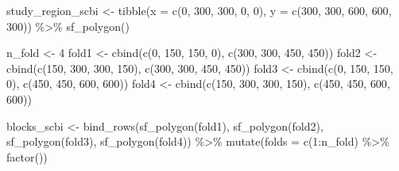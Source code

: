 \documentclass[12pt]{article}
\newenvironment{Shaded}{\begin{snugshade}}{\end{snugshade}}
\newcommand{\AttributeTok}[1]{\textcolor[rgb]{0.77,0.63,0.00}{#1}}
\newcommand{\DecValTok}[1]{\textcolor[rgb]{0.00,0.00,0.81}{#1}}
\newcommand{\FunctionTok}[1]{\textcolor[rgb]{0.00,0.00,0.00}{#1}}
\newcommand{\NormalTok}[1]{#1}
\newcommand{\OtherTok}[1]{\textcolor[rgb]{0.56,0.35,0.01}{#1}}
\newcommand{\SpecialCharTok}[1]{\textcolor[rgb]{0.00,0.00,0.00}{#1}}
\begin{document}
\begin{Shaded}
\begin{Highlighting}[]
\NormalTok{study\_region\_scbi }\OtherTok{\textless{}{-}} \FunctionTok{tibble}\NormalTok{(}\AttributeTok{x =} \FunctionTok{c}\NormalTok{(}\DecValTok{0}\NormalTok{, }\DecValTok{300}\NormalTok{, }\DecValTok{300}\NormalTok{, }\DecValTok{0}\NormalTok{, }\DecValTok{0}\NormalTok{), }\AttributeTok{y =} \FunctionTok{c}\NormalTok{(}\DecValTok{300}\NormalTok{, }\DecValTok{300}\NormalTok{, }\DecValTok{600}\NormalTok{,}
    \DecValTok{600}\NormalTok{, }\DecValTok{300}\NormalTok{)) }\SpecialCharTok{\%\textgreater{}\%}
    \FunctionTok{sf\_polygon}\NormalTok{()}

\NormalTok{n\_fold }\OtherTok{\textless{}{-}} \DecValTok{4}
\NormalTok{fold1 }\OtherTok{\textless{}{-}} \FunctionTok{cbind}\NormalTok{(}\FunctionTok{c}\NormalTok{(}\DecValTok{0}\NormalTok{, }\DecValTok{150}\NormalTok{, }\DecValTok{150}\NormalTok{, }\DecValTok{0}\NormalTok{), }\FunctionTok{c}\NormalTok{(}\DecValTok{300}\NormalTok{, }\DecValTok{300}\NormalTok{, }\DecValTok{450}\NormalTok{, }\DecValTok{450}\NormalTok{))}
\NormalTok{fold2 }\OtherTok{\textless{}{-}} \FunctionTok{cbind}\NormalTok{(}\FunctionTok{c}\NormalTok{(}\DecValTok{150}\NormalTok{, }\DecValTok{300}\NormalTok{, }\DecValTok{300}\NormalTok{, }\DecValTok{150}\NormalTok{), }\FunctionTok{c}\NormalTok{(}\DecValTok{300}\NormalTok{, }\DecValTok{300}\NormalTok{, }\DecValTok{450}\NormalTok{, }\DecValTok{450}\NormalTok{))}
\NormalTok{fold3 }\OtherTok{\textless{}{-}} \FunctionTok{cbind}\NormalTok{(}\FunctionTok{c}\NormalTok{(}\DecValTok{0}\NormalTok{, }\DecValTok{150}\NormalTok{, }\DecValTok{150}\NormalTok{, }\DecValTok{0}\NormalTok{), }\FunctionTok{c}\NormalTok{(}\DecValTok{450}\NormalTok{, }\DecValTok{450}\NormalTok{, }\DecValTok{600}\NormalTok{, }\DecValTok{600}\NormalTok{))}
\NormalTok{fold4 }\OtherTok{\textless{}{-}} \FunctionTok{cbind}\NormalTok{(}\FunctionTok{c}\NormalTok{(}\DecValTok{150}\NormalTok{, }\DecValTok{300}\NormalTok{, }\DecValTok{300}\NormalTok{, }\DecValTok{150}\NormalTok{), }\FunctionTok{c}\NormalTok{(}\DecValTok{450}\NormalTok{, }\DecValTok{450}\NormalTok{, }\DecValTok{600}\NormalTok{, }\DecValTok{600}\NormalTok{))}

\NormalTok{blocks\_scbi }\OtherTok{\textless{}{-}} \FunctionTok{bind\_rows}\NormalTok{(}\FunctionTok{sf\_polygon}\NormalTok{(fold1), }\FunctionTok{sf\_polygon}\NormalTok{(fold2), }\FunctionTok{sf\_polygon}\NormalTok{(fold3),}
    \FunctionTok{sf\_polygon}\NormalTok{(fold4)) }\SpecialCharTok{\%\textgreater{}\%}
    \FunctionTok{mutate}\NormalTok{(}\AttributeTok{folds =} \FunctionTok{c}\NormalTok{(}\DecValTok{1}\SpecialCharTok{:}\NormalTok{n\_fold) }\SpecialCharTok{\%\textgreater{}\%}
        \FunctionTok{factor}\NormalTok{())}


\end{Highlighting}
\end{Shaded}
\end{document}
